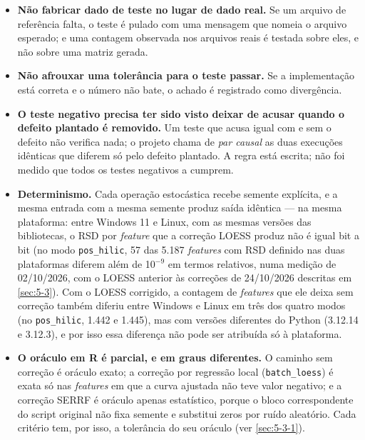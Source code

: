 \begin{itemize}
\item \textbf{Não fabricar dado de teste no lugar de dado real.} Se um arquivo de referência falta, o teste é pulado com uma mensagem que nomeia o arquivo esperado; e uma contagem observada nos arquivos reais é testada sobre eles, e não sobre uma matriz gerada.
\item \textbf{Não afrouxar uma tolerância para o teste passar.} Se a implementação está correta e o número não bate, o achado é registrado como divergência.
\item \textbf{O teste negativo precisa ter sido visto deixar de acusar quando o defeito plantado é removido.} Um teste que acusa igual com e sem o defeito não verifica nada; o projeto chama de \textit{par causal} as duas execuções idênticas que diferem só pelo defeito plantado. A regra está escrita; não foi medido que todos os testes negativos a cumprem.
\item \textbf{Determinismo.} Cada operação estocástica recebe semente explícita, e a mesma entrada com a mesma semente produz saída idêntica --- na mesma plataforma: entre Windows 11 e Linux, com as mesmas versões das bibliotecas, o RSD por \textit{feature} que a correção LOESS produz não é igual bit a bit (no modo \texttt{pos\_\allowbreak{}hilic}, 57 das 5.187 \textit{features} com RSD definido nas duas plataformas diferem além de 10$^{-9}$ em termos relativos, numa medição de 02/10/2026, com o LOESS anterior às correções de 24/10/2026 descritas em \ref{sec:5-3}). Com o LOESS corrigido, a contagem de \textit{features} que ele deixa sem correção também diferiu entre Windows e Linux em três dos quatro modos (no \texttt{pos\_\allowbreak{}hilic}, 1.442 e 1.445), mas com versões diferentes do Python (3.12.14 e 3.12.3), e por isso essa diferença não pode ser atribuída só à plataforma.
\item \textbf{O oráculo em R é parcial, e em graus diferentes.} O caminho sem correção é oráculo exato; a correção por regressão local (\texttt{batch\_\allowbreak{}loess}) é exata só nas \textit{features} em que a curva ajustada não teve valor negativo; e a correção SERRF é oráculo apenas estatístico, porque o bloco correspondente do script original não fixa semente e substitui zeros por ruído aleatório. Cada critério tem, por isso, a tolerância do seu oráculo (ver \ref{sec:5-3-1}).
\end{itemize}


